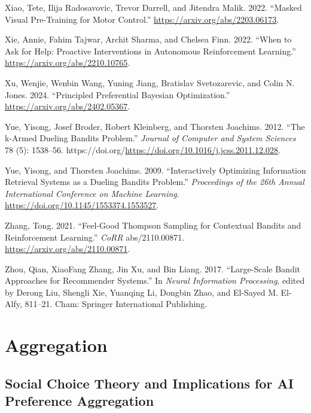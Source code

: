 \documentclass[
  letterpaper,
  numbers=noenddot,
  DIV=11]{scrreprt}
\newlength{\cslhangindent}
\newenvironment{CSLReferences}[2] %
 {\begin{list}{}{%
  \setlength{\itemindent}{0pt}
  \setlength{\leftmargin}{0pt}
  \setlength{\parsep}{0pt}
  \ifodd #1
   \setlength{\leftmargin}{\cslhangindent}
   \setlength{\itemindent}{-1\cslhangindent}
  \fi
  \setlength{\itemsep}{#2\baselineskip}}}
 {\end{list}}
\let\oldchapter\chapter
\def\chapter{%
  \setcounter{sidenote}{1}%
  \oldchapter
}
\theoremstyle{plain}
\theoremstyle{definition}
\theoremstyle{remark}
\begin{document}
\begin{CSLReferences}{1}{0}
Xiao, Tete, Ilija Radosavovic, Trevor Darrell, and Jitendra Malik. 2022.
{``Masked Visual Pre-Training for Motor Control.''}
\url{https://arxiv.org/abs/2203.06173}.

Xie, Annie, Fahim Tajwar, Archit Sharma, and Chelsea Finn. 2022. {``When
to Ask for Help: Proactive Interventions in Autonomous Reinforcement
Learning.''} \url{https://arxiv.org/abs/2210.10765}.

Xu, Wenjie, Wenbin Wang, Yuning Jiang, Bratislav Svetozarevic, and Colin
N. Jones. 2024. {``Principled Preferential Bayesian Optimization.''}
\url{https://arxiv.org/abs/2402.05367}.

Yue, Yisong, Josef Broder, Robert Kleinberg, and Thorsten Joachims.
2012. {``The k-Armed Dueling Bandits Problem.''} \emph{Journal of
Computer and System Sciences} 78 (5): 1538--56.
https://doi.org/\url{https://doi.org/10.1016/j.jcss.2011.12.028}.

Yue, Yisong, and Thorsten Joachims. 2009. {``Interactively Optimizing
Information Retrieval Systems as a Dueling Bandits Problem.''}
\emph{Proceedings of the 26th Annual International Conference on Machine
Learning}. \url{https://doi.org/10.1145/1553374.1553527}.

Zhang, Tong. 2021. {``Feel-Good Thompson Sampling for Contextual Bandits
and Reinforcement Learning.''} \emph{CoRR} abs/2110.00871.
\url{https://arxiv.org/abs/2110.00871}.

Zhou, Qian, XiaoFang Zhang, Jin Xu, and Bin Liang. 2017. {``Large-Scale
Bandit Approaches for Recommender Systems.''} In \emph{Neural
Information Processing}, edited by Derong Liu, Shengli Xie, Yuanqing Li,
Dongbin Zhao, and El-Sayed M. El-Alfy, 811--21. Cham: Springer
International Publishing.

\end{CSLReferences}


\chapter{Aggregation}\label{aggregation}

\section{Social Choice Theory and Implications for AI Preference
Aggregation}\label{social-choice-theory-and-implications-for-ai-preference-aggregation}
\end{document}
